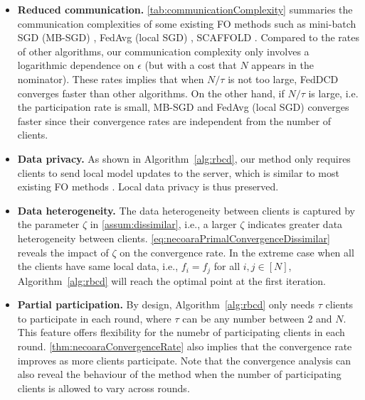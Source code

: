 \begin{itemize}
    \item \textbf{Reduced communication.} 
    \autoref{tab:communicationComplexity} summaries the communication complexities of some existing FO methods such as mini-batch SGD (MB-SGD) \citep{WoodworthPS20}, FedAvg (local SGD) \citep{mcmahan2017communication}, SCAFFOLD \citep{pmlr-v119-karimireddy20a}. Compared to the rates of other algorithms, our communication complexity only involves a logarithmic dependence on $\epsilon$ (but with a cost that $N$ appears in the nominator). These rates implies that when $N/\tau$ is not too large, FedDCD converges faster than other algorithms.
    On the other hand, if $N/\tau$ is large, i.e. the participation rate is small, MB-SGD and FedAvg (local SGD) converges faster since their convergence rates are independent from the number of clients. 
    \item \textbf{Data privacy.} As shown in Algorithm~\ref{alg:rbcd}, our method only requires clients to send local model updates to the server, which is similar to most existing FO methods \citep{mcmahan2017communication,li2018federated,yuan2021federated,karimireddy2020mime}. Local data privacy is thus preserved. 
    \item \textbf{Data heterogeneity.} 
    The data heterogeneity between clients is captured by the parameter $\zeta$ in \autoref{assum:dissimilar}, i.e., a larger $\zeta$ indicates greater data heterogeneity between clients. \eqref{eq:necoaraPrimalConvergenceDissimilar} reveals the impact of $\zeta$ on the convergence rate. In the extreme case when all the clients have same local data, i.e., $f_i = f_j$ for all $i,j \in [N]$, Algorithm~\ref{alg:rbcd} will reach the optimal point at the first iteration.
    \item \textbf{Partial participation.} By design, Algorithm~\ref{alg:rbcd} only needs $\tau$ clients to participate in each round, where $\tau$ can be any number between $2$ and $N$. This feature offers flexibility for the numebr of participating clients in each round. \autoref{thm:necoaraConvergenceRate} also implies that the convergence rate improves as more clients participate. Note that the convergence analysis can also reveal the behaviour of the method when the number of participating clients is allowed to vary across rounds.
\end{itemize}

